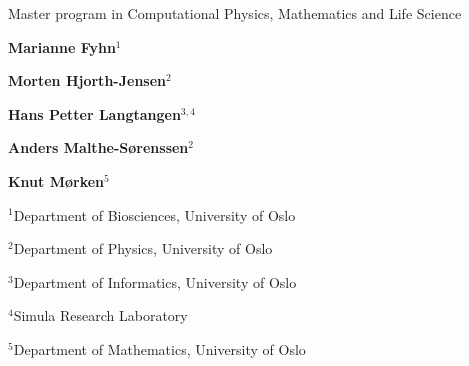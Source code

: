 \documentclass[%
twoside,                 %
final,                   %
10pt]{article}
\begin{document}






\thispagestyle{empty}

\begin{center}
{\LARGE\bf
\begin{spacing}{1.25}
Master program in Computational Physics, Mathematics and Life Science
\end{spacing}
}
\end{center}


\begin{center}
{\bf Marianne Fyhn${}^{1}$} \\ [0mm]
\end{center}

    
\begin{center}
{\bf Morten Hjorth-Jensen${}^{2}$} \\ [0mm]
\end{center}

    
\begin{center}
{\bf Hans Petter Langtangen${}^{3, 4}$} \\ [0mm]
\end{center}

    
\begin{center}
{\bf Anders Malthe-Sørenssen${}^{2}$} \\ [0mm]
\end{center}

    
\begin{center}
{\bf Knut Mørken${}^{5}$} \\ [0mm]
\end{center}

    \begin{center}
\centerline{{\small ${}^1$Department of Biosciences, University of Oslo}}
\centerline{{\small ${}^2$Department of Physics, University of Oslo}}
\centerline{{\small ${}^3$Department of Informatics, University of Oslo}}
\centerline{{\small ${}^4$Simula Research Laboratory}}
\centerline{{\small ${}^5$Department of Mathematics, University of Oslo}}
\end{center}
    
\end{document}
